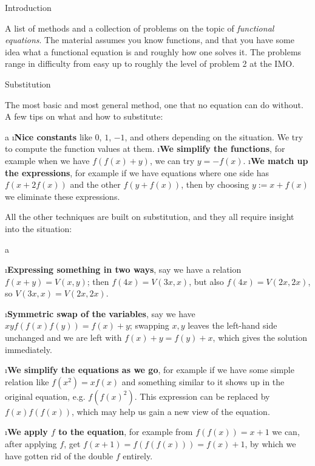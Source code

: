 





\sec Introduction

A list of methods and a collection of problems on the topic of \textit{functional equations}. The material assumes you know functions, and that you have some idea what a functional equation is and roughly how one solves it. The problems range in difficulty from easy up to roughly the level of problem 2 at the IMO.

\sec Substitution

The most basic and most general method, one that no equation can do without. A few tips on what and how to substitute:

\begitems \style a
\i \textbf{Nice constants} like $0$, $1$, $-1$, and others depending on the situation. We try to compute the function values at them.
\i \textbf{We simplify the functions}, for example when we have $f(f(x)+y)$, we can try $y=-f(x)$.
\i \textbf{We match up the expressions}, for example if we have equations where one side has $f(x+2f(x))$ and the other $f(y+f(x))$, then by choosing $y:=x+f(x)$ we eliminate these expressions.
\enditems

All the other techniques are built on substitution, and they all require insight into the situation:

\begitems \style a

\i \textbf{Expressing something in two ways}, say we have a relation $f(x+y)=V(x,y)$; then $f(4x)=V(3x,x)$, but also $f(4x)=V(2x,2x)$, so $V(3x,x)=V(2x,2x)$.

\i \textbf{Symmetric swap of the variables}, say we have $xyf(f(x)f(y))=f(x)+y$; swapping $x,y$ leaves the left-hand side unchanged and we are left with $f(x)+y=f(y)+x$, which gives the solution immediately.

\i \textbf{We simplify the equations as we go}, for example if we have some simple relation like $f(x^2)=xf(x)$ and something similar to it shows up in the original equation, e.g. $f(f(x)^2)$. This expression can be replaced by $f(x)f(f(x))$, which may help us gain a new view of the equation.

\i \textbf{We apply $f$ to the equation}, for example from $f(f(x))=x+1$ we can, after applying $f$, get $f(x+1)=f(f(f(x)))=f(x)+1$, by which we have gotten rid of the double $f$ entirely.

